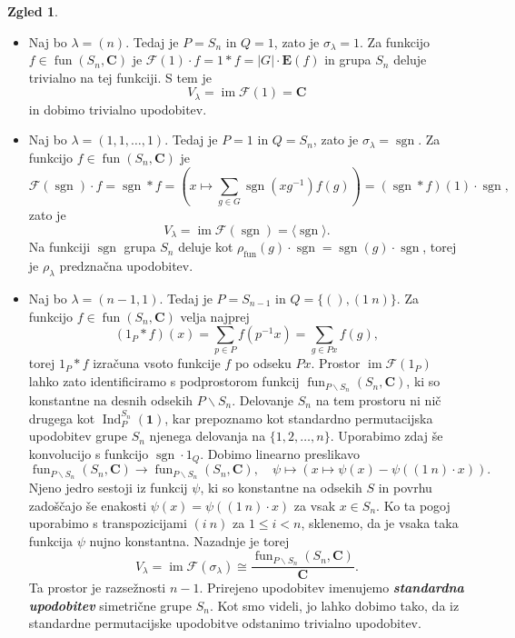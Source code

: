 \documentclass[11pt]{book}
\def\CC{\mathbf{C}}
\def\11{\mathbf{1}}
\def\Fcal{\mathcal{F}}
\def\EE{\mathbf{E}}
\def\youngsym{\sigma_{\lambda}}
\DeclareMathOperator\image{im}
\DeclareMathOperator\sgn{sgn}
\DeclareMathOperator\Ind{Ind}
\DeclareMathOperator\fun{fun}
\def\definicija{\color{rdeca}\bf\em}
\theoremstyle{definition}
\theoremstyle{zgled}
\newtheorem*{zgled}{Zgled}
\theoremstyle{odprtproblem}
\theoremstyle{domacanaloga}
\theoremstyle{izrek}
\begin{document}
\begin{zgled} \leavevmode
\begin{itemize}
    \item Naj bo $\lambda = (n)$. Tedaj je $P = S_n$ in $Q = 1$, zato je $\youngsym = 1$. Za funkcijo $f \in \fun(S_n, \CC)$ je $\Fcal(1) \cdot f = 1 * f = |G| \cdot \EE(f)$ in grupa $S_n$ deluje trivialno na tej funkciji. S tem je
    \[
        V_{\lambda} = \image \Fcal(1) = \CC
    \]
    in dobimo trivialno upodobitev.

    \item Naj bo $\lambda = (1,1,\dots,1)$. Tedaj je $P = 1$ in $Q = S_n$, zato je $\youngsym = \sgn$. Za funkcijo $f \in \fun(S_n, \CC)$ je
    \[
        \Fcal(\sgn) \cdot f = \sgn * f = \left( x \mapsto \sum_{g \in G} \sgn(xg^{-1}) f(g) \right) = (\sgn * f)(1) \cdot \sgn,
    \]
    zato je
    \[
        V_{\lambda} = \image \Fcal(\sgn) = \langle \sgn \rangle.
    \]
    Na funkciji $\sgn$ grupa $S_n$ deluje kot $\rho_{\fun}(g) \cdot \sgn = \sgn(g) \cdot \sgn$, torej je $\rho_{\lambda}$ predznačna upodobitev.
    
    \item Naj bo $\lambda = (n-1,1)$. Tedaj je $P = S_{n-1}$ in $Q = \{ (), (1 \ n)\}$. Za funkcijo $f \in \fun(S_n, \CC)$ velja najprej
    \[
        \left( 1_P * f \right) (x) = \sum_{p \in P} f(p^{-1} x) = \sum_{g \in Px} f(g),
    \]
    torej $1_P * f$ izračuna vsoto funkcije $f$ po odseku $Px$. Prostor $\image \Fcal(1_P)$ lahko zato identificiramo s podprostorom funkcij $\fun_{P \backslash S_n}(S_n, \CC)$, ki so konstantne na desnih odsekih $P \backslash S_n$. Delovanje $S_n$ na tem prostoru ni nič drugega kot $\Ind^{S_n}_P(\11)$, kar prepoznamo kot standardno permutacijska upodobitev grupe $S_n$ njenega delovanja na $\{ 1, 2, \dots, n \}$. Uporabimo zdaj še konvolucijo s funkcijo $\sgn \cdot 1_Q$. Dobimo linearno preslikavo
    \[
        \textstyle \fun_{P \backslash S_n}(S_n, \CC) \to \fun_{P \backslash S_n}(S_n, \CC), \quad
        \psi \mapsto \left( x \mapsto \psi(x) - \psi((1 \ n) \cdot x) \right).
    \]
    Njeno jedro sestoji iz funkcij $\psi$, ki so konstantne na odsekih $S$ in povrhu zadoščajo še enakosti $\psi(x) = \psi((1 \ n) \cdot x)$ za vsak $x \in S_n$. Ko ta pogoj uporabimo s transpozicijami $(i \ n)$ za $1 \leq i < n$, sklenemo, da je vsaka taka funkcija $\psi$ nujno konstantna. Nazadnje je torej
    \[
        V_{\lambda} = \image \Fcal(\youngsym) \cong \frac{\textstyle \fun_{P \backslash S_n}(S_n, \CC)}{\CC}.
    \]
    Ta prostor je razsežnosti $n-1$. Prirejeno upodobitev imenujemo {\definicija standardna upodobitev} simetrične grupe $S_n$. Kot smo videli, jo lahko dobimo tako, da iz standardne permutacijske upodobitve odstanimo trivialno upodobitev.
\end{itemize}
\end{zgled}
\end{document}
